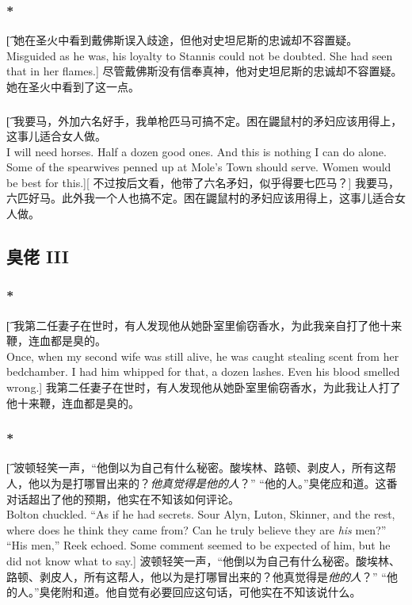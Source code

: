 \documentclass[12pt,a4paper]{article}
\begin{document}
\subsubsection{\color{red}*}\t[
	她在圣火中看到戴佛斯误入歧途，但他对史坦尼斯的忠诚却不容置疑。\\
	Misguided as he was, his loyalty to Stannis could not be doubted. She had seen that in her flames.]
	尽管戴佛斯没有信奉真神，他对史坦尼斯的忠诚却不容置疑。她在圣火中看到了这一点。
	
\subsubsection{}\t[
	我要马，外加六名好手，我单枪匹马可搞不定。困在鼹鼠村的矛妇应该用得上，这事儿适合女人做。\\
	I will need horses. Half a dozen good ones. And this is nothing I can do alone. Some of the spearwives penned up at Mole's Town should serve. Women would be best for this.][
	不过按后文看，他带了六名矛妇，似乎得要七匹马？]
	我要马，六匹好马。此外我一个人也搞不定。困在鼹鼠村的矛妇应该用得上，这事儿适合女人做。
	
\subsection{臭佬 III}
\subsubsection{\color{red}*}\t[
	我第二任妻子在世时，有人发现他从她卧室里偷窃香水，为此我亲自打了他十来鞭，连血都是臭的。\\
	Once, when my second wife was still alive, he was caught stealing scent from her bedchamber. I had him whipped for that, a dozen lashes. Even his blood smelled wrong.]
	我第二任妻子在世时，有人发现他从她卧室里偷窃香水，为此我让人打了他十来鞭，连血都是臭的。
	
\subsubsection{\color{red}*}\t[
	波顿轻笑一声，“他倒以为自己有什么秘密。酸埃林、路顿、剥皮人，所有这帮人，他以为是打哪冒出来的？\emph{他真觉得是他的人}？” “他的人。”臭佬应和道。这番对话超出了他的预期，他实在不知该如何评论。\\
	Bolton chuckled. “As if he had secrets. Sour Alyn, Luton, Skinner, and the rest, where does he think they came from? Can he truly believe they are \emph{his} men?” “His men,” Reek echoed. Some comment seemed to be expected of him, but he did not know what to say.]
	波顿轻笑一声，“他倒以为自己有什么秘密。酸埃林、路顿、剥皮人，所有这帮人，他以为是打哪冒出来的？他真觉得是\emph{他的人}？” “他的人。”臭佬附和道。他自觉有必要回应这句话，可他实在不知该说什么。
	
\end{document}

